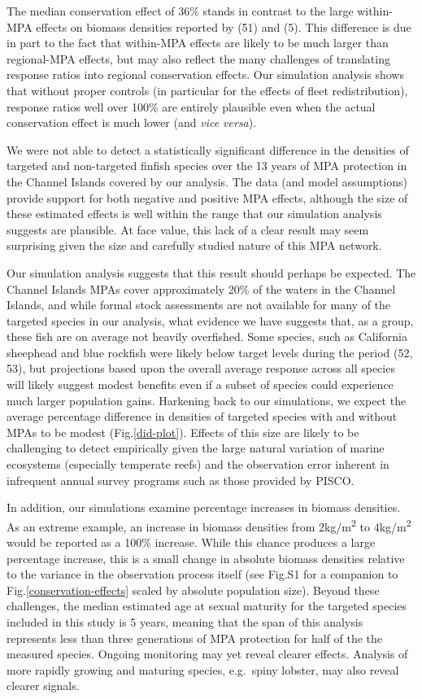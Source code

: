 \documentclass[9pt,twocolumn,twoside,lineno]{pnas-new}
\begin{document}
The median conservation effect of 36\% stands in contrast to the large
within-MPA effects on biomass densities reported by (51) and (5). This
difference is due in part to the fact that within-MPA effects are likely
to be much larger than regional-MPA effects, but may also reflect the
many challenges of translating response ratios into regional
conservation effects. Our simulation analysis shows that without proper
controls (in particular for the effects of fleet redistribution),
response ratios well over 100\% are entirely plausible even when the
actual conservation effect is much lower (and \emph{vice versa}).

We were not able to detect a statistically significant difference in the
densities of targeted and non-targeted finfish species over the 13 years
of MPA protection in the Channel Islands covered by our analysis. The
data (and model assumptions) provide support for both negative and
positive MPA effects, although the size of these estimated effects is
well within the range that our simulation analysis suggests are
plausible. At face value, this lack of a clear result may seem
surprising given the size and carefully studied nature of this MPA
network.

Our simulation analysis suggests that this result should perhaps be
expected. The Channel Islands MPAs cover approximately 20\% of the
waters in the Channel Islands, and while formal stock assessments are
not available for many of the targeted species in our analysis, what
evidence we have suggests that, as a group, these fish are on average
not heavily overfished. Some species, such as California sheephead and
blue rockfish were likely below target levels during the period (52,
53), but projections based upon the overall average response across all
species will likely suggest modest benefits even if a subset of species
could experience much larger population gains. Harkening back to our
simulations, we expect the average percentage difference in densities of
targeted species with and without MPAs to be modest
(Fig.\ref{did-plot}). Effects of this size are likely to be challenging
to detect empirically given the large natural variation of marine
ecosystems (especially temperate reefs) and the observation error
inherent in infrequent annual survey programs such as those provided by
PISCO.

In addition, our simulations examine percentage increases in biomass
densities. As an extreme example, an increase in biomass densities from
2kg/m\textsuperscript{2} to 4kg/m\textsuperscript{2} would be reported
as a 100\% increase. While this chance produces a large percentage
increase, this is a small change in absolute biomass densities relative
to the variance in the observation process itself (see Fig.S1 for a
companion to Fig.\ref{conservation-effects} scaled by absolute
population size). Beyond these challenges, the median estimated age at
sexual maturity for the targeted species included in this study is 5
years, meaning that the span of this analysis represents less than three
generations of MPA protection for half of the the measured species.
Ongoing monitoring may yet reveal clearer effects. Analysis of more
rapidly growing and maturing species, e.g.~spiny lobster, may also
reveal clearer signals.
\end{document}

